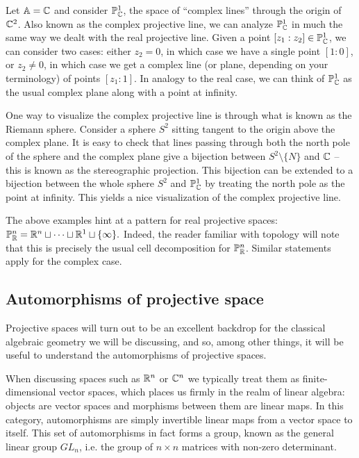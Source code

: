 \documentclass{../../mathnotes}
\begin{document}
\begin{exmp}
    Let $\mathbb{A}=\mathbb{C}$ and consider $\mathbb{P}^1_{\mathbb{C}}$, the space of ``complex lines'' through the origin of $\mathbb{C}^2$. Also known as the
    complex projective line, we can analyze $\mathbb{P}^1_{\mathbb{C}}$ in much the same way we dealt with the real projective line.
    Given a point $[z_1:z_2]\in\mathbb{P}^1_{\mathbb{C}}$, we can consider two cases: either $z_2=0$, in which case we have a single point
    $[1:0]$, or $z_2\neq0$, in which case we get a complex line (or plane, depending on your terminology) of points $[z_1:1]$.
    In analogy to the real case, we can think of $\mathbb{P}^1_{\mathbb{C}}$ as the usual complex plane along with a point at infinity.

    One way to visualize the complex projective line is through what is known as the Riemann sphere. Consider a sphere $S^2$
    sitting tangent to the origin above the complex plane. It is easy to check that lines passing through both the north
    pole of the sphere and the complex plane give a bijection between $S^2\setminus\{N\}$ and $\mathbb{C}$ -- this is known as the
    stereographic projection. This bijection can be extended to a bijection between the whole sphere $S^2$ and $\mathbb{P}^1_{\mathbb{C}}$
    by treating the north pole as the point at infinity. This yields a nice visualization of the complex projective line.
\end{exmp}

\begin{rem}
The above examples hint at a pattern for real projective spaces: $\mathbb{P}^n_{\mathbb{R}}=\mathbb{R}^n\sqcup\cdots\sqcup\mathbb{R}^1\sqcup\{\infty\}.$
Indeed, the reader familiar with topology will note that this is precisely the usual cell decomposition for $\mathbb{P}_{\mathbb{R}}^n$.
Similar statements apply for the complex case.
\end{rem}

\subsection*{Automorphisms of projective space}

Projective spaces will turn out to be an excellent backdrop for the classical algebraic geometry we will be discussing,
and so, among other things, it will be useful to understand the automorphisms of projective spaces.

When discussing spaces such as $\mathbb{R}^n$ or $\mathbb{C}^n$ we typically treat them as finite-dimensional vector spaces, which places us firmly
in the realm of linear algebra: objects are vector spaces and morphisms between them are linear maps. In this category,
automorphisms are simply invertible linear maps from a vector space to itself. This set of automorphisms in fact forms a group,
known as the general linear group $GL_n$, i.e. the group of $n\times n$ matrices with non-zero determinant.
\end{document}
